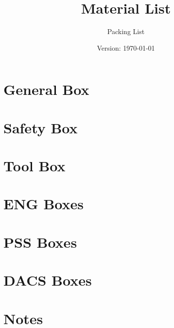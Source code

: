 \documentclass{article}
\title{Material List}
\author{Packing List}
\date{Version: \isodate\today}
\begin{document}
\maketitle

\thispagestyle{fancy}

\renewcommand{\thesection}{\Alph{section}}

\section{General Box}


\section{Safety Box}


\section{Tool Box}


\section{ENG Boxes}


\section{PSS Boxes}


\section{DACS Boxes}


\newpage


\setcounter{section}{0}
\section*{Notes}

\end{document}
